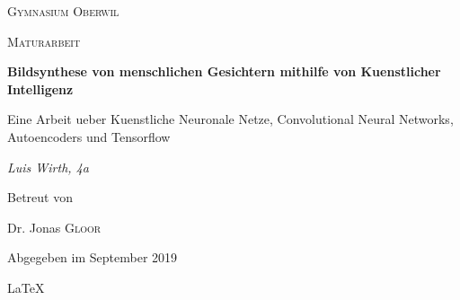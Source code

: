 \documentclass[../main]{subfiles}
\begin{document}
\begin{titlepage}
    \centering

    {\scshape\LARGE Gymnasium Oberwil\par}
    \vspace{1cm}
    {\scshape\Large Maturarbeit\par}
    \vspace{1.5cm}
    {\huge\bfseries Bildsynthese von menschlichen Gesichtern mithilfe von Kuenstlicher Intelligenz\par}
    \vspace{0.2cm}
    {\large Eine Arbeit ueber Kuenstliche Neuronale Netze, Convolutional Neural
      Networks, Autoencoders und Tensorflow\par}
    \vspace{2cm}
    {\Large\itshape Luis Wirth, 4a\par}
    \vfill
    Betreut von\par
    Dr. Jonas \textsc{Gloor}

    \vfill
    {\large Abgegeben im September 2019\par}
    \LaTeX{}
\end{titlepage}
\end{document}
